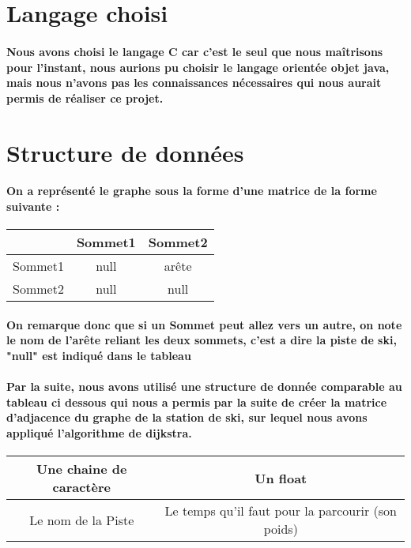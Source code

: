 \documentclass[a4paper,11pt,fleqn]{article}
\begin{document}
\section{Langage choisi}

\paragraph{ Nous avons choisi le langage C car c'est le seul que nous maîtrisons pour l'instant, nous aurions pu choisir le langage orientée objet java, mais nous n'avons pas les connaissances nécessaires qui nous aurait permis de réaliser ce projet.} 

\newpage
\hspace{5cm}
\section{Structure de données}

\paragraph{On a représenté le graphe sous la forme d'une matrice de la forme suivante :
\newline
\newline
}
\begin{tabular}{|c|c|c|}
\hline  \cellcolor{black} & Sommet1 & Sommet2 \\
\hline Sommet1 & null & arête \\
\hline Sommet2 & null & null \\
\hline 
\end{tabular}
\paragraph{On remarque donc que si un Sommet peut allez vers un autre, on note le nom de l'arête reliant les deux sommets, c'est a dire la piste de ski, "null" est indiqué dans le tableau}
\paragraph{Par la suite, nous avons utilisé une structure de donnée comparable au tableau ci dessous qui nous a permis par la suite de créer la matrice d'adjacence du graphe de la station de ski, sur lequel nous avons appliqué l'algorithme de dijkstra.
\newline
\newline}
\begin{tabular}{|c|c|}
\hline  Une chaine de caractère & Un float \\
\hline Le nom de la Piste & Le temps qu'il faut pour la parcourir (son poids) \\
\hline
\end{tabular}
\end{document}
